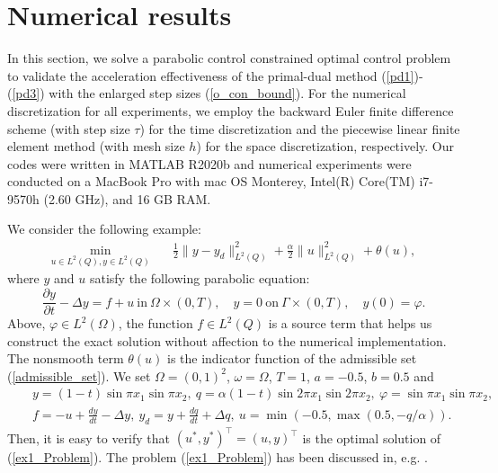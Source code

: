 \documentclass[final]{siamart171218}
\theoremstyle{remark}
\begin{document}
\section{Numerical results}\label{sec:numerical}

In this section, we solve a parabolic control constrained optimal control problem to validate the acceleration effectiveness of the primal-dual method (\ref{pd1})-(\ref{pd3}) with the enlarged step sizes (\ref{o_con_bound}). For the numerical discretization for all experiments, we employ the backward Euler finite difference scheme (with step size $\tau$) for the time discretization and the piecewise linear finite element method (with mesh size $h$) for the space discretization, respectively. Our codes were written in MATLAB R2020b and numerical experiments were conducted on a MacBook Pro with mac OS Monterey, Intel(R) Core(TM) i7-9570h (2.60 GHz), and 16 GB RAM.

We consider the following example:
\begin{equation}\label{ex1_Problem}
\begin{aligned}
\min_{u\in L^2(Q), y\in L^2(Q)} \quad  &\frac{1}{2}\|y-y_d\|_{L^2(Q)}^2+\frac{\alpha}{2}\|u\|_{L^2(Q)}^2+\theta(u),
\end{aligned}
\end{equation}
where $y$ and $u$ satisfy the following parabolic equation:
\begin{equation}\label{ex1_state}
\frac{\partial y}{\partial t}-\Delta y=f+u~ \text{in}~ \Omega\times(0,T), \quad
y=0~ \text{on}~ \Gamma\times(0,T),\quad y(0)=\varphi.
\end{equation}
Above, $\varphi\in L^2(\Omega)$, the function $f\in L^2(Q)$ is a source term that helps us construct the exact solution without affection to the numerical implementation. The nonsmooth term $\theta(u)$ is the indicator function of the admissible set (\ref{admissible_set}). We set $\Omega=(0,1)^2$, $\omega=\Omega$, $T=1$, $a=-0.5$, $b=0.5$ and
\begin{eqnarray*}
	&&y=(1-t)\sin\pi x_1\sin\pi x_2,~ q=\alpha (1-t)\sin 2\pi x_1\sin 2\pi x_2,~\varphi=\sin \pi x_1\sin \pi x_2, \\
	&&f=-u+\frac{dy}{dt}-\Delta y, ~ y_d=y+\frac{dq}{dt}+\Delta q,~ u=\min(-0.5,\max(0.5,-q/\alpha)).
\end{eqnarray*}
Then, it is easy to verify that $(u^*,y^*)^\top=(u, y)^\top$ is the optimal solution of  (\ref{ex1_Problem}). The problem (\ref{ex1_Problem}) has been discussed in, e.g. \cite{andrade2012multigrid,glowinski2022}.
\end{document}
